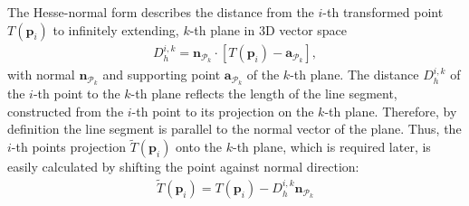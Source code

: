 \documentclass[5p]{elsarticle}
\renewcommand{\vec}[1]{\mathbf{#1}}
\begin{document}
The Hesse-normal form describes the distance from the $i$-th transformed point $T(\vec{p}_i)$ to infinitely extending, $k$-th plane in 3D vector space
\begin{align}\label{eq:hesse}
	D_{h}^{i,k} = \vec{n}_{\mathcal{P}_k} \cdot \left[ T(\vec{p}_i) - \vec{a}_{\mathcal{P}_k} \right] ,
\end{align}
with normal $\vec{n}_{\mathcal{P}_k}$ and supporting point $\vec{a}_{\mathcal{P}_k}$ of the $k$-th plane.
The distance $D_{h}^{i,k}$ of the $i$-th point to the $k$-th plane reflects the length of the line segment, constructed from the $i$-th point to its projection on the $k$-th plane.
Therefore, by definition the line segment is parallel to the normal vector of the plane.
Thus, the $i$-th points projection $\widetilde{T}(\vec{p}_i)$ onto the $k$-th plane, which is required later, is easily calculated by shifting the point against normal direction:
\begin{align}\label{eq:projection}
	\widetilde{T}(\vec{p}_i) = T(\vec{p}_i) - D_{h}^{i,k} \vec{n}_{\mathcal{P}_k}
\end{align}
\end{document}
